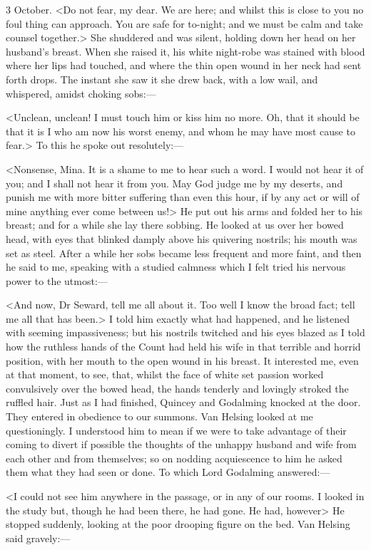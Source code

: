 \begin{diary}{3 October.}
<Do not fear, my dear. We are here; and whilst this is close to you no foul thing can approach. You are safe for to-night; and we must be calm and take counsel together.> She shuddered and was silent, holding down her head on her husband's breast. When she raised it, his white night-robe was stained with blood where her lips had touched, and where the thin open wound in her neck had sent forth drops. The instant she saw it she drew back, with a low wail, and whispered, amidst choking sobs:—

<Unclean, unclean! I must touch him or kiss him no more. Oh, that it should be that it is I who am now his worst enemy, and whom he may have most cause to fear.> To this he spoke out resolutely:—

<Nonsense, Mina. It is a shame to me to hear such a word. I would not hear it of you; and I shall not hear it from you. May God judge me by my deserts, and punish me with more bitter suffering than even this hour, if by any act or will of mine anything ever come between us!> He put out his arms and folded her to his breast; and for a while she lay there sobbing. He looked at us over her bowed head, with eyes that blinked damply above his quivering nostrils; his mouth was set as steel. After a while her sobs became less frequent and more faint, and then he said to me, speaking with a studied calmness which I felt tried his nervous power to the utmost:—

<And now, Dr Seward, tell me all about it. Too well I know the broad fact; tell me all that has been.> I told him exactly what had happened, and he listened with seeming impassiveness; but his nostrils twitched and his eyes blazed as I told how the ruthless hands of the Count had held his wife in that terrible and horrid position, with her mouth to the open wound in his breast. It interested me, even at that moment, to see, that, whilst the face of white set passion worked convulsively over the bowed head, the hands tenderly and lovingly stroked the ruffled hair. Just as I had finished, Quincey and Godalming knocked at the door. They entered in obedience to our summons. Van Helsing looked at me questioningly. I understood him to mean if we were to take advantage of their coming to divert if possible the thoughts of the unhappy husband and wife from each other and from themselves; so on nodding acquiescence to him he asked them what they had seen or done. To which Lord Godalming answered:—

<I could not see him anywhere in the passage, or in any of our rooms. I looked in the study but, though he had been there, he had gone. He had, however\longdash> He stopped suddenly, looking at the poor drooping figure on the bed. Van Helsing said gravely:—


\end{diary}
